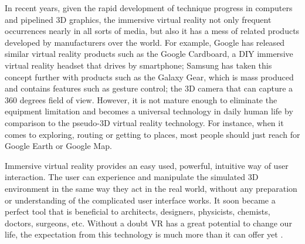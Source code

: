 In recent years, given the rapid development of technique progress in computers and pipelined 3D graphics, the immersive virtual reality not only frequent occurrences nearly in all sorts of media, but also it has a mess of related products developed by manufacturers over the world. For example, Google has released similar virtual reality products such as the Google Cardboard, a DIY immersive virtual reality headset that drives by smartphone; Samsung has taken this concept further with products such as the Galaxy Gear, which is mass produced and contains features such as gesture control; the 3D camera that can capture a 360 degrees field of view. However, it is not mature enough to eliminate the equipment limitation and becomes a universal technology in daily human life by comparison to the pseudo-3D virtual reality technology. For instance, when it comes to exploring, routing or getting to places, most people should just reach for Google Earth or Google Map.

Immersive virtual reality provides an easy used, powerful, intuitive way of user interaction. The user can experience and manipulate the simulated 3D environment in the same way they act in the real world, without any preparation or understanding of the complicated user interface works. It soon became a perfect tool that is beneficial to architects, designers, physicists, chemists, doctors, surgeons, etc. Without a doubt VR has a great potential to change our life, the expectation from this technology is much more than it can offer yet \cite{mazuryk.vr.1996}.

